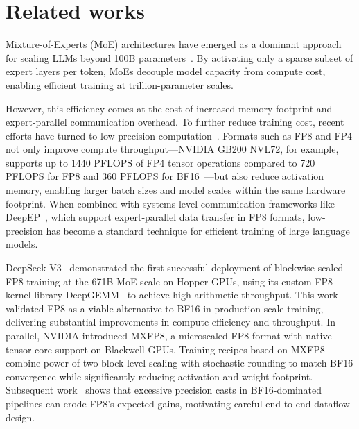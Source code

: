 \section{Related works}
\label{sec:related}

Mixture-of-Experts (MoE) architectures have emerged as a dominant approach for scaling LLMs beyond 100B parameters~\cite{deepseekv3, kimik22025}. By activating only a sparse subset of expert layers per token, MoEs decouple model capacity from compute cost, enabling efficient training at trillion-parameter scales.

However, this efficiency comes at the cost of increased memory footprint and expert-parallel communication overhead. To further reduce training cost, recent efforts have turned to low-precision computation~\cite{peng2023fp8}. Formats such as FP8 and FP4 not only improve compute throughput—NVIDIA GB200 NVL72, for example, supports up to 1440 PFLOPS of FP4 tensor operations compared to 720 PFLOPS for FP8 and 360 PFLOPS for BF16~\cite{gb200_specs}—but also reduce activation memory, enabling larger batch sizes and model scales within the same hardware footprint. When combined with systems-level communication frameworks like DeepEP~\cite{deepep2025}, which support expert-parallel data transfer in FP8 formats, low-precision has become a standard technique for efficient training of large language models.

DeepSeek-V3~\cite{deepseekv3} demonstrated the first successful deployment of blockwise-scaled FP8 training at the 671B MoE scale on Hopper GPUs, using its custom FP8 kernel library DeepGEMM~\cite{deepgemm2025} to achieve high arithmetic throughput. This work validated FP8 as a viable alternative to BF16 in production-scale training, delivering substantial improvements in compute efficiency and throughput. In parallel, NVIDIA introduced MXFP8, a microscaled FP8 format with native tensor core support on Blackwell GPUs. Training recipes based on MXFP8~\cite{mxfp8recipe} combine power-of-two block-level scaling with stochastic rounding to match BF16 convergence while significantly reducing activation and weight footprint. Subsequent work~\cite{fp8flowmoe2025} shows that excessive precision casts in BF16-dominated pipelines can erode FP8's expected gains, motivating careful end-to-end dataflow design.

